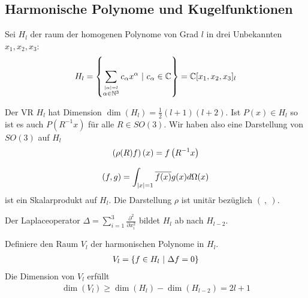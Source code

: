 \subsection{Harmonische Polynome und Kugelfunktionen}

\begin{definition}[$H_l$]
    Sei $H_l$ der raum der homogenen Polynome von Grad $l$ in drei
    Unbekannten $x_1,x_2,x_3$:
    \begin{align*}
        H_l = \left\{ \sum_{\stackrel{\left\vert \alpha \right\vert = l}{\alpha \in \mathbb{N}^3}} c_\alpha x^\alpha \ | \ c_\alpha \in \mathbb{C} \right\}
        = \mathbb{C}[x_1,x_2,x_3]_l
    \end{align*}
\end{definition}

\begin{korollar}
    Der VR $H_l$ hat Dimension $\dim(H_l) = \frac{1}{2} (l+1)(l+2)$.
    Ist $P(x) \in H_l$ so ist es auch $P(R^{-1} x)$ für alle $R \in SO(3)$.
    Wir haben also eine Darstellung von $SO(3)$ auf $H_l$
    \begin{align*}
        \left( \rho(R) f \right)(x) = f \left( R^{-1} x \right)
    \end{align*}
\end{korollar}

\begin{lemma}
    \begin{align*}
        (f,g) = \int_{\left\vert x \right\vert=1} \overline{f(x)} g(x) d \Omega(x)
    \end{align*}
    ist ein Skalarprodukt auf $H_l$. Die Darstellung $\rho$ ist unitär
    bezüglich $( \ , \ )$.
\end{lemma}

\begin{bemerkung}
    Der Laplaceoperator $\Delta = \sum_{i=1}^3 \frac{\partial^2}{\partial x_i^2}$
    bildet $H_l$ ab nach $H_{l-2}$.
\end{bemerkung}

\begin{definition}[$V_l$]
    Definiere den Raum $V_l$ der harmonischen Polynome in $H_l$.
    \begin{align*}
        V_l = \left\{ f \in H_l \ | \ \Delta f = 0 \right\}
    \end{align*}
    Die Dimension von $V_l$ erfüllt
    \begin{align*}
        \dim(V_l) \geq \dim(H_l) - \dim(H_{l-2}) = 2l+1
    \end{align*}
\end{definition}

